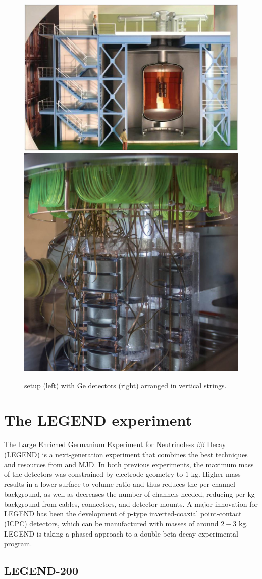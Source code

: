 \begin{figure}
\centering
\includegraphics[height=0.385\columnwidth]{ch2/figs/gerda_setup.pdf}
\qquad
\includegraphics[height=0.385\columnwidth]{ch2/figs/gerdastrings.pdf}
\caption{{\Gerda} setup (left) with Ge detectors (right) arranged in vertical strings.}
\label{ch2_fig_gerda_setup}
\end{figure}
  
\section{The LEGEND experiment}
The Large Enriched Germanium Experiment for Neutrinoless $\beta\beta$ Decay (LEGEND) is a next-generation experiment that combines the best techniques and resources from {\Gerda} and MJD. In both previous experiments, the maximum mass of the detectors was constrained by electrode geometry to $1$ kg. Higher mass results in a lower surface-to-volume ratio and thus reduces the per-channel background, as well as decreases the number of channels needed, reducing per-kg background from cables, connectors, and detector mounts. A major innovation for LEGEND has been the development of p-type inverted-coaxial point-contact (ICPC) detectors, which can be manufactured with masses of around $2-3$ kg. LEGEND is taking a phased approach to a double-beta decay experimental program.

\subsection{LEGEND-200}

